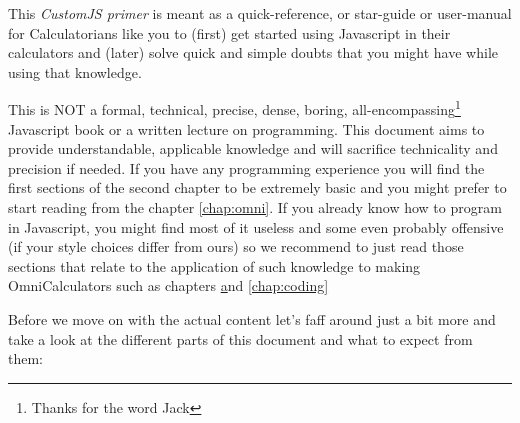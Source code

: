 \documentclass[11pt,a4paper,oldfontcommands]{memoir}
\begin{document}
    This \textit{CustomJS primer} is meant as a quick-reference, or star-guide or user-manual for Calculatorians like you to (first) get started using Javascript in their calculators and (later) solve quick and simple doubts that you might have while using that knowledge.

This is NOT a formal, technical, precise, dense, boring, all-encompassing\footnote{Thanks for the word Jack} Javascript book or a written lecture on programming. This document aims to provide understandable, applicable knowledge and will sacrifice technicality and precision if needed. 
If you have any programming experience you will find the first sections of the second chapter to be extremely basic and you might prefer to start reading from the chapter \ref{chap:omni}. If you already know how to program in Javascript, you might find most of it useless and some even probably offensive (if your style choices differ from ours) so we recommend to just read those sections that relate to the application of such knowledge to making OmniCalculators such as chapters \href{chap:omni} and \ref{chap:coding}

Before we move on with the actual content let's faff around just a bit more and take a look at the different parts of this document and what to expect from them:

\iffalse
\begin{itemize}
    \item Chapter 1.- \textbf{Before you start} 
        \subitem Section 1.1 - A brief description of that is CustomJS what it does and how and when to use it
        \subitem Section 1.2 - Quick overview of the functions specific to omni that don't exist in regular JS
        \subitem Section 1.3 - A \textit{Gepe-complete}\footnote{\textit{Gepe-complete} Refers to an item that's been deemed complete by Alvaro Diez} start guide to get you started in programming from scratch, plus some additions relevant to CustomJS at Omni
        \subitem Section 1.4 - A collection of \textit{rules} that we have in place at Omni and their reasons to exist
    \item Chapter 2.- \textbf{Okay so you are already coding...}
        \subitem Section 2.1 - Basic and advance use cases in Custom JS with strong focus on Omni functions
        \subitem Section 2.2 - How to prevent errors and what to do when they happen
        \subitem Section 2.3 - Style guide as agreed by most of Omni Calculatorians. Follow or be bullied.
\end{itemize}
\fi
\end{document}
